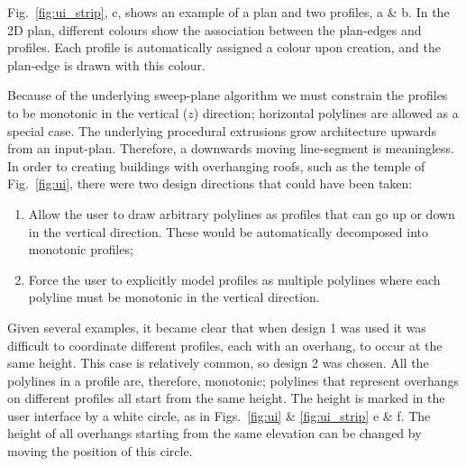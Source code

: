 Fig.~\ref{fig:ui_strip}, c, shows an example of a plan and two profiles, a \& b. In the 2D plan, different colours show the association between the plan-edges and profiles. Each profile is automatically assigned a colour upon creation, and the plan-edge is drawn with this colour. 

Because of the underlying sweep-plane algorithm we must constrain the profiles to be monotonic in the vertical ($z$) direction; horizontal polylines are allowed as a special case. The underlying procedural extrusions grow architecture upwards from an input-plan. Therefore, a downwards moving line-segment is meaningless. In order to creating buildings with overhanging roofs, such as the temple of Fig.~\ref{fig:ui}, there were two design directions that could have been taken:

\begin{enumerate}
\item {Allow the user to draw arbitrary polylines as profiles that can go up or down in the vertical direction. These would be automatically decomposed into monotonic profiles;}
\item{Force the user to explicitly model profiles as multiple polylines where each polyline must be monotonic in the vertical direction.}
\end{enumerate}

Given several examples, it became clear that when design 1 was used it was difficult to coordinate different profiles, each with an overhang, to occur at the same height. This case is relatively common, so design 2 was chosen. All the polylines in a profile are, therefore, monotonic; polylines that represent overhangs on different profiles all start from the same height. The height is marked in the user interface by a white circle, as in Figs.~\ref{fig:ui} \& \ref{fig:ui_strip} e \& f. The height of all overhangs starting from the same elevation can be changed by moving the position of this circle.

